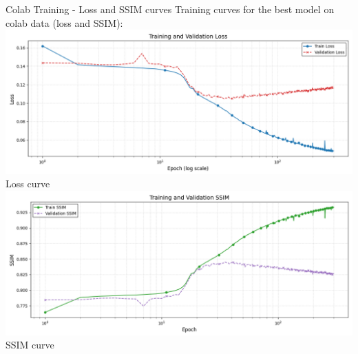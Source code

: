 \documentclass[footline=authortitle]{beamer}
\begin{document}
\begin{frame}[fragile]{Colab Training - Loss and SSIM curves}
    Training curves for the best model on colab data (loss and SSIM):
    \newline
    \includegraphics[width=0.7\linewidth]{images/colab_loss_curve.png}
    \newline
    \small Loss curve 
    \newline
    \includegraphics[width=0.7\linewidth]{images/colab_ssim_curve.png}
    \newline
    \small SSIM curve 
\end{frame}
\end{document}
